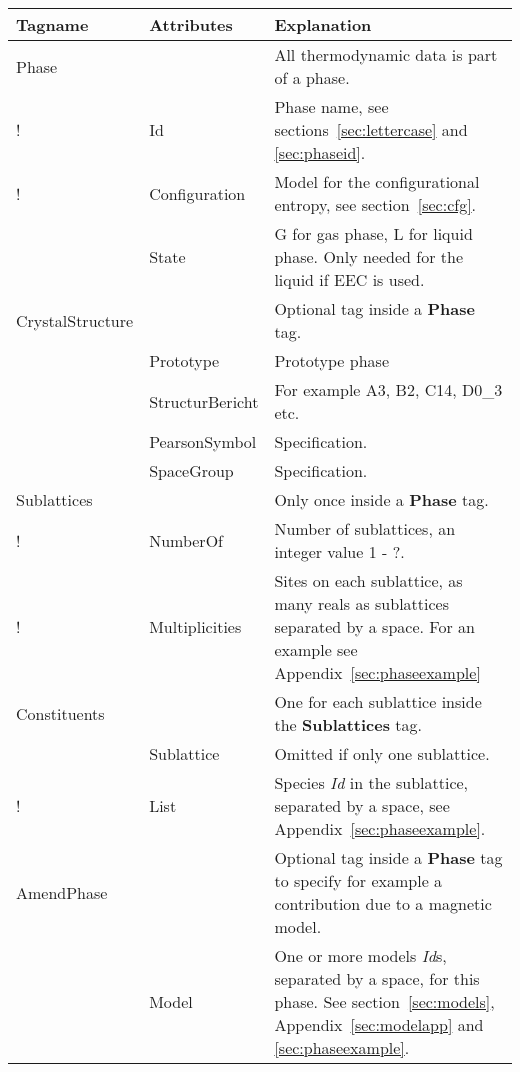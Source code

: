 \documentclass{article}
\begin{document}
\begin{tabular}{|p{} p{} p{}|}\hline
  Tagname& Attributes & Explanation\\\hline

  Phase & & All thermodynamic data is part of a phase.\\
!       & Id & Phase name, see sections~\ref{sec:lettercase} and 
               \ref{sec:phaseid}. \\

!       & Configuration &  Model for the configurational entropy, 
                see section~\ref{sec:cfg}.\\

         & State & G for gas phase, L for liquid phase.  
                Only needed for the liquid if EEC is used.\\\hline

  CrystalStructure & & Optional tag inside a {\bf Phase} tag.\\
        & Prototype & Prototype phase \\
        & StructurBericht & For example A3, B2, C14, D0\_3 etc.\\
        & PearsonSymbol & Specification.\\
        & SpaceGroup & Specification.\\\hline

  Sublattices & & Only once inside a {\bf Phase} tag.\\
!        & NumberOf &  Number of sublattices, an integer value 1 - ?. \\
!        & Multiplicities & Sites on each sublattice, as many reals as
               sublattices separated by a space.  For an example 
               see Appendix~\ref{sec:phaseexample}\\\hline

  Constituents & & One for each sublattice inside the {\bf Sublattices} tag.\\
             & Sublattice & Omitted if only one sublattice.\\
!           & List &  Species {\em Id} in the sublattice,
             separated by a space, see Appendix~\ref{sec:phaseexample}.\\\hline

  AmendPhase & & Optional tag inside a {\bf Phase} tag to specify
               for example a contribution due to a magnetic model.\\
     & Model & One or more models {\em Id}s, separated by a space, for this
         phase.  See section~\ref{sec:models}, Appendix~\ref{sec:modelapp}
         and \ref{sec:phaseexample}.\\\hline


\end{tabular}
\end{document}
